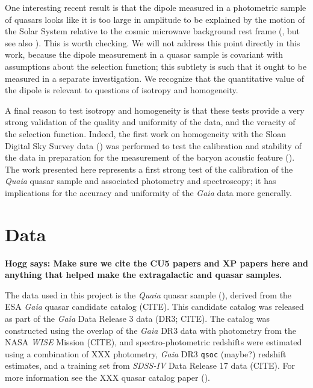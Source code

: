 \documentclass[modern]{aastex631}
\newcommand{\hogg}[1]{\textbf{Hogg says: #1}}
\begin{document}
One interesting recent result is that the dipole measured in a photometric sample of quasars looks like it is too large in amplitude to be explained by the motion of the Solar System relative to the cosmic microwave background rest frame (\citealt{secrest, dam}, but see also \citealt{guandalin}).
This is worth checking.
We will not address this point directly in this work, because the dipole measurement in a quasar sample is covariant with assumptions about the selection function; this subtlety is such that it ought to be measured in a separate investigation.
We recognize that the quantitative value of the dipole is relevant to questions of isotropy and homogeneity.

A final reason to test isotropy and homogeneity is that these tests provide a very strong validation of the quality and uniformity of the data, and the veracity of the selection function.
Indeed, the first work on homogeneity with the Sloan Digital Sky Survey data (\citealt{hogg05}) was performed to test the calibration and stability of the data in preparation for the measurement of the baryon acoustic feature (\citealt{baf}).
The work presented here represents a first strong test of the calibration of the \textsl{Quaia} quasar sample and associated photometry and spectroscopy; it has implications for the accuracy and uniformity of the \textsl{Gaia} data more generally.

\section{Data}\label{sec:data}\noindent
\hogg{Make sure we cite the CU5 papers and XP papers here and anything that helped make the extragalactic and quasar samples.}

The data used in this project is the \textsl{Quaia} quasar sample (\citealt{quaia}), derived from the ESA \textsl{Gaia} quasar candidate catalog (CITE).
This candidate catalog was released as part of the \textsl{Gaia} Data Release 3 data (DR3; CITE).
The catalog was constructed using the overlap of the \textsl{Gaia} DR3 data with photometry from the NASA \textsl{WISE} Mission (CITE), and spectro-photometric redshifts were estimated using a combination of XXX photometry, \textsl{Gaia} DR3 \texttt{qsoc} (maybe?) redshift estimates, and a training set from \textsl{SDSS-IV} Data Release 17 data (CITE).
For more information see the XXX quasar catalog paper (\citealt{quaia}).
\end{document}
